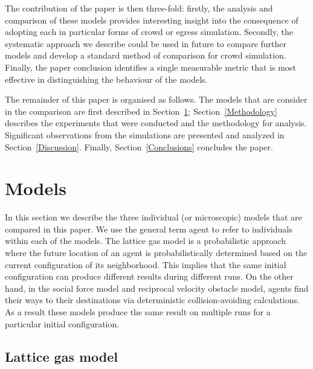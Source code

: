 The contribution of the paper is then three-fold: firstly, the analysis and comparison of these models provides interesting insight into the consequence of adopting each in particular forms of crowd or egress simulation. Secondly, the systematic approach we describe could be used in future to compare further models and develop a standard method of comparison for crowd simulation. Finally, the paper conclusion identifies a single measurable metric that is most effective in distinguishing the behaviour of the models.

The remainder of this paper is organised as follows. The models that are consider in the comparison are first described in Section~\ref{Models}; Section~\ref{Methodology} describes the experiments that were conducted and the methodology for analysis. Significant observations from the simulations are presented and analyzed in Section~\ref{Discussion}. Finally, Section~\ref{Conclusions} concludes the paper.


\section{Models}
\label{Models}

In this section we describe the three individual (or microscopic) models that are compared in this paper. We use the general term agent to refer to individuals within each of the models. The lattice gas model is a probabilistic approach where the future location of an agent is probabilistically determined based on the current configuration of its neighborhood. This implies that the same initial configuration can produce different results during different runs. On the other hand, in the social force model and reciprocal velocity obstacle model, agents find their ways to their destinations via deterministic collision-avoiding calculations. As a result these models produce the same result on multiple runs for a particular initial configuration.




\subsection{Lattice gas model}
\label{LatticeGasModel}

